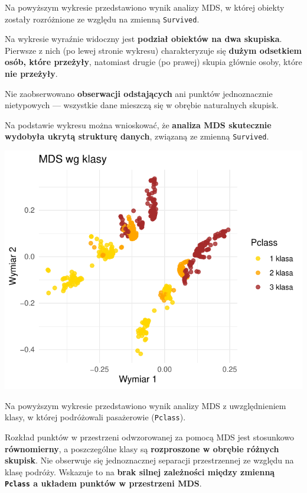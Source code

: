 \documentclass[
  12pt,
]{article}
\begin{document}
Na powyższym wykresie przedstawiono wynik analizy MDS, w której obiekty
zostały rozróżnione ze względu na zmienną \texttt{Survived}.

Na wykresie wyraźnie widoczny jest \textbf{podział obiektów na dwa
skupiska}. Pierwsze z nich (po lewej stronie wykresu) charakteryzuje się
\textbf{dużym odsetkiem osób, które przeżyły}, natomiast drugie (po
prawej) skupia głównie osoby, które \textbf{nie przeżyły}.

Nie zaobserwowano \textbf{obserwacji odstających} ani punktów
jednoznacznie nietypowych --- wszystkie dane mieszczą się w obrębie
naturalnych skupisk.

Na podstawie wykresu można wnioskować, że \textbf{analiza MDS skutecznie
wydobyła ukrytą strukturę danych}, związaną ze zmienną
\texttt{Survived}.

\begin{center}\includegraphics{Sprawozdanie2_files/figure-latex/wyk2-1} \end{center}

Na powyższym wykresie przedstawiono wynik analizy MDS z uwzględnieniem
klasy, w której podróżowali pasażerowie (\texttt{Pclass}).

Rozkład punktów w przestrzeni odwzorowanej za pomocą MDS jest stosunkowo
\textbf{równomierny}, a poszczególne klasy są \textbf{rozproszone w
obrębie różnych skupisk}. Nie obserwuje się jednoznacznej separacji
przestrzennej ze względu na klasę podróży. Wskazuje to na \textbf{brak
silnej zależności między zmienną \texttt{Pclass} a układem punktów w
przestrzeni MDS}.
\end{document}
